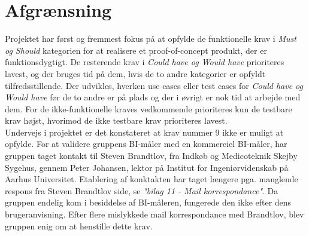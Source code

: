 \chapter{Afgrænsning}
Projektet har først og fremmest fokus på at opfylde de funktionelle krav i \textit{Must og Should} kategorien for at realisere et proof-of-concept produkt, der er funktionsdygtigt. De resterende krav i \textit{Could have og Would have} prioriteres lavest, og der bruges tid på dem, hvis de to andre kategorier er opfyldt tilfredsstillende. Der udvikles, hverken use cases eller test cases for \textit{Could have og Would have} før de to andre er på plads og der i øvrigt er nok tid at arbejde med dem. For de ikke-funktionelle kraves vedkommende prioriteres kun de testbare krav højst, hvorimod de ikke testbare krav prioriteres lavest. \\


Undervejs i projektet er det konstateret at krav nummer 9 ikke er muligt at opfylde. For at validere gruppens BI-måler med en kommerciel BI-måler, har gruppen taget kontakt til Steven Brandtlov, fra Indkøb og Medicoteknik Skejby Sygehus, gennem  Peter Johansen, lektor på Institut for Ingeniørvidenskab på Aarhus Universitet. Etablering af konktakten har taget længere pga. manglende respons fra Steven Brandtlov side, se \textit{"bilag 11 - Mail korrespondance"}. Da gruppen endelig kom i besiddelse af BI-måleren,  fungerede den ikke efter dens brugeranvisning. Efter flere mislykkede mail korrespondance med Brandtlov, blev gruppen enig om at henstille dette krav.      